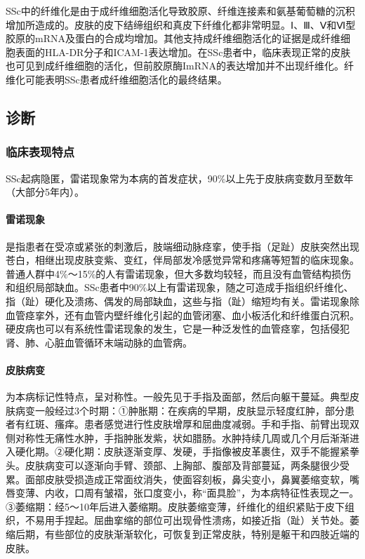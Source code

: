 SSc中的纤维化是由于成纤维细胞活化导致胶原、纤维连接素和氨基葡萄糖的沉积增加所造成的。皮肤的皮下结缔组织和真皮下纤维化都非常明显。Ⅰ、Ⅲ、Ⅴ和Ⅵ型胶原的mRNA及蛋白的合成均增加。其他支持成纤维细胞活化的证据是成纤维细胞表面的HLA-DR分子和ICAM-1表达增加。在SSc患者中，临床表现正常的皮肤也可见到成纤维细胞的活化，但前胶原酶ImRNA的表达增加并不出现纤维化。纤维化可能表明SSc患者成纤维细胞活化的最终结果。

\subsection{诊断}

\subsubsection{临床表现特点}

SSc起病隐匿，雷诺现象常为本病的首发症状，90\%以上先于皮肤病变数月至数年（大部分5年内）。

\paragraph{雷诺现象}

是指患者在受凉或紧张的刺激后，肢端细动脉痉挛，使手指（足趾）皮肤突然出现苍白，相继出现皮肤变紫、变红，伴局部发冷感觉异常和疼痛等短暂的临床现象。普通人群中4\%～15\%的人有雷诺现象，但大多数均较轻，而且没有血管结构损伤和组织局部缺血。SSc患者中90\%以上有雷诺现象，随之可造成手指组织纤维化、指（趾）硬化及溃疡、偶发的局部缺血，这些与指（趾）缩短均有关。雷诺现象除血管痉挛外，还有血管内壁纤维化引起的血管闭塞、血小板活化和纤维蛋白沉积。硬皮病也可以有系统性雷诺现象的发生，它是一种泛发性的血管痉挛，包括侵犯肾、肺、心脏血管循环末端动脉的血管病。

\paragraph{皮肤病变}

为本病标记性特点，呈对称性。一般先见于手指及面部，然后向躯干蔓延。典型皮肤病变一般经过3个时期：①肿胀期：在疾病的早期，皮肤显示轻度红肿，部分患者有红斑、瘙痒。患者感觉进行性皮肤增厚和屈曲度减弱。手和手指、前臂出现双侧对称性无痛性水肿，手指肿胀发紫，状如腊肠。水肿持续几周或几个月后渐渐进入硬化期。②硬化期：皮肤逐渐变厚、发硬，手指像被皮革裹住，双手不能握紧拳头。皮肤病变可以逐渐向手臂、颈部、上胸部、腹部及背部蔓延，两条腿很少受累。面部皮肤受损造成正常面纹消失，使面容刻板，鼻尖变小，鼻翼萎缩变软，嘴唇变薄、内收，口周有皱褶，张口度变小，称“面具脸”，为本病特征性表现之一。③萎缩期：经5～10年后进入萎缩期。皮肤萎缩变薄，纤维化的组织紧贴于皮下组织，不易用手捏起。屈曲挛缩的部位可出现骨性溃疡，如接近指（趾）关节处。萎缩后期，有些部位的皮肤渐渐软化，可恢复到正常皮肤，特别是躯干和四肢近端的皮肤。

